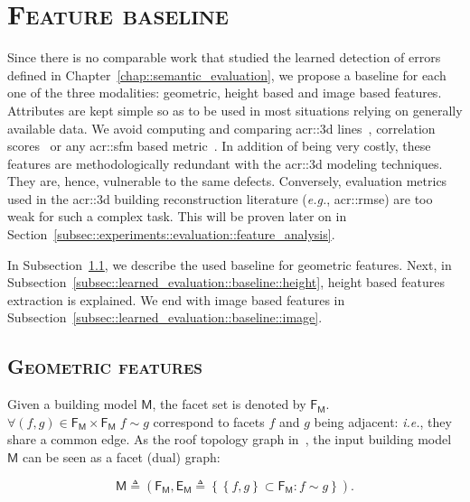 \section{\textsc{Feature baseline}}
    \label{sec::learned_evaluation::baseline}
    Since there is no comparable work that studied the learned detection of errors defined in Chapter~\ref{chap::semantic_evaluation}, we propose a baseline for each one of the three modalities: geometric, height based and image based features.
    Attributes are kept simple so as to be used in most situations relying on generally available data.
    We avoid computing and comparing \gls{acr::3d} lines~\parencite{michelin2013quality}, correlation scores~\parencite{boudet2006supervised} or any \gls{acr::sfm} based metric~\parencite{kowdle2011active}.
    In addition of being very costly, these features are methodologically redundant with the \gls{acr::3d} modeling techniques.
    They are, hence, vulnerable to the same defects.
    Conversely, evaluation metrics used in the \gls{acr::3d} building reconstruction literature (\textit{e.g.}, \gls{acr::rmse}) are too weak for such a complex task.
    This will be proven later on in Section~\ref{subsec::experiments::evaluation::feature_analysis}.

    In Subsection~\ref{subsec::learned_evaluation::baseline::geometric}, we describe the used baseline for geometric features.
    Next, in Subsection~\ref{subsec::learned_evaluation::baseline::height}, height based features extraction is explained.
    We end with image based features in Subsection~\ref{subsec::learned_evaluation::baseline::image}.

    \subsection{\textsc{Geometric features}}
        \label{subsec::learned_evaluation::baseline::geometric}
        Given a building model \(\mathsf{M}\), the facet set is denoted by $\mathsf{F_M}$.
        $\forall (f, g) \in \mathsf{F_M} \times \mathsf{F_M} \; f \sim g$ correspond to facets $f$ and $g$ being adjacent: 
        \textit{i.e.}, they share a common edge. As the roof topology graph in~\parencite{verma20063d}, the input building model $\mathsf{M}$ can be seen as a facet (dual) graph:

        \begin{equation}
        	\label{eq::model_graph}
        	\mathsf{M} \triangleq \left(\mathsf{F_M}, \mathsf{E_M} \triangleq \left\{ \left\{f, g\right\} \subset \mathsf{F_M} : f \sim g \right\} \right).
        \end{equation}

